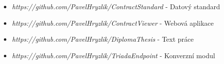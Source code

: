\begin{itemize}
\item[] \textit{https://github.com/PavelHryzlik/ContractStandard} - Datový standard
\item[] \textit{https://github.com/PavelHryzlik/ContractViewer} - Webová aplikace
\item[] \textit{https://github.com/PavelHryzlik/DiplomaThesis} - Text práce
\item[] \textit{https://github.com/PavelHryzlik/TriadaEndpoint} - Konverzní modul
\end{itemize}






